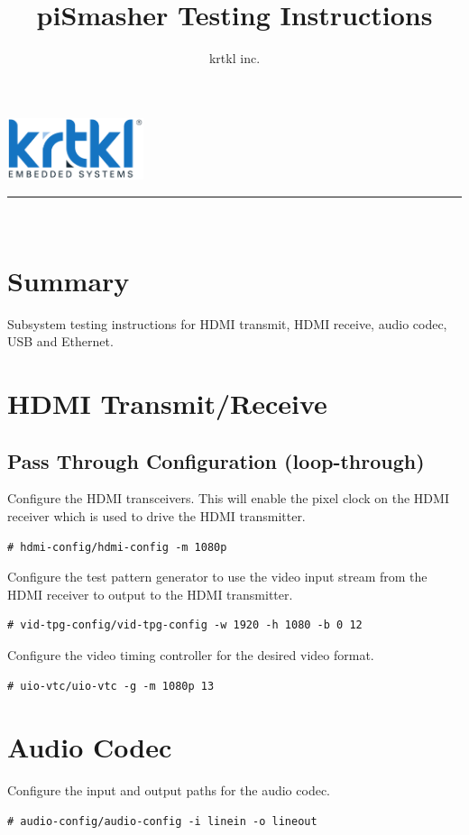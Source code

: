 \documentclass[sfsidenotes, justified]{tufte-handout}
\title{piSmasher Testing Instructions}
\author{krtkl inc.}
\makeatletter
\renewcommand{\maketitle}{%
  \newpage
  \begin{fullwidth}
    \par{\LARGE\scshape\@title}
    \hfill
    \includegraphics[width=0.3\textwidth]{images/krtkl.pdf} \\ 
    \rule{\linewidth}{0.5pt} \\
  \end{fullwidth}
}
\makeatother
\begin{document}
  \maketitle
  
  \section{Summary}
  
  Subsystem testing instructions for HDMI transmit, HDMI receive, audio codec, USB and Ethernet.
  
  \tableofcontents
  \listoffigures

	\newpage
  \section{HDMI Transmit/Receive}
    
    \subsection{Pass Through Configuration (loop-through)}
    
    
    Configure the HDMI transceivers. This will enable the pixel clock on the HDMI receiver which is used to drive the HDMI transmitter.
    
\begin{lstlisting}
# hdmi-config/hdmi-config -m 1080p
\end{lstlisting}
    
	Configure the test pattern generator to use the video input stream from the HDMI receiver to output to the HDMI transmitter.
	
\begin{lstlisting}
# vid-tpg-config/vid-tpg-config -w 1920 -h 1080 -b 0 12
\end{lstlisting}


	Configure the video timing controller for the desired video format.
	
\begin{lstlisting}
# uio-vtc/uio-vtc -g -m 1080p 13 
\end{lstlisting}

\section{Audio Codec}


Configure the input and output paths for the audio codec.

\begin{lstlisting}
# audio-config/audio-config -i linein -o lineout
\end{lstlisting}


    
\end{document}
